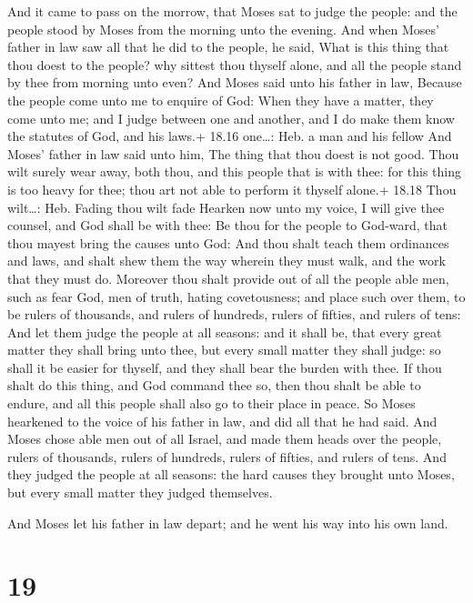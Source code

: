  And it came to pass on the morrow, that Moses sat to
judge the people: and the people stood by Moses from the morning unto
the evening.  And when Moses' father in law saw all that he
did to the people, he said, What is this thing that thou doest to the
people? why sittest thou thyself alone, and all the people stand by thee
from morning unto even?  And Moses said unto his father in
law, Because the people come unto me to enquire of God: 
When they have a matter, they come unto me; and I judge between one and
another, and I do make them know the statutes of God, and his laws.+
18.16 one\ldots: Heb. a man and his fellow  And Moses'
father in law said unto him, The thing that thou doest is not good.
 Thou wilt surely wear away, both thou, and this people
that is with thee: for this thing is too heavy for thee; thou art not
able to perform it thyself alone.+ 18.18 Thou wilt\ldots: Heb. Fading
thou wilt fade  Hearken now unto my voice, I will give thee
counsel, and God shall be with thee: Be thou for the people to God-ward,
that thou mayest bring the causes unto God:  And thou shalt
teach them ordinances and laws, and shalt shew them the way wherein they
must walk, and the work that they must do.  Moreover thou
shalt provide out of all the people able men, such as fear God, men of
truth, hating covetousness; and place such over them, to be rulers of
thousands, and rulers of hundreds, rulers of fifties, and rulers of
tens:  And let them judge the people at all seasons: and it
shall be, that every great matter they shall bring unto thee, but every
small matter they shall judge: so shall it be easier for thyself, and
they shall bear the burden with thee.  If thou shalt do
this thing, and God command thee so, then thou shalt be able to endure,
and all this people shall also go to their place in peace. 
So Moses hearkened to the voice of his father in law, and did all that
he had said.  And Moses chose able men out of all Israel,
and made them heads over the people, rulers of thousands, rulers of
hundreds, rulers of fifties, and rulers of tens.  And they
judged the people at all seasons: the hard causes they brought unto
Moses, but every small matter they judged themselves.

 And Moses let his father in law depart; and he went his
way into his own land.

\hypertarget{section-18}{%
\section{19}\label{section-18}}

